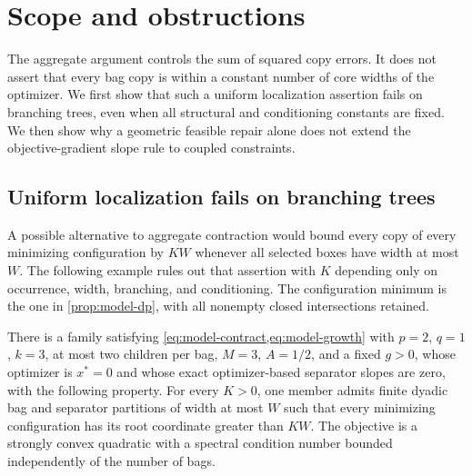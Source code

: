 \section{Scope and obstructions}\label{sec:limitations}

The aggregate argument controls the sum of squared copy errors. It does not
assert that every bag copy is within a constant number of core widths of
the optimizer. We first show that such a uniform localization assertion
fails on branching trees, even when all structural and conditioning
constants are fixed. We then show why a geometric feasible repair alone
does not extend the objective-gradient slope rule to coupled constraints.

\subsection{Uniform localization fails on branching trees}
\label{sec:limitations-localization}

A possible alternative to aggregate contraction would bound every copy of
every minimizing configuration by $KW$ whenever all selected boxes have
width at most $W$. The following example rules out that assertion with
$K$ depending only on occurrence, width, branching, and conditioning.
The configuration minimum is the one in \cref{prop:model-dp}, with all
nonempty closed intersections retained.

\begin{theorem}
\label{thm:limitations-localization}
There is a family satisfying \cref{eq:model-contract,eq:model-growth}
with $p=2$, $q=1$, $k=3$, at most two children per bag, $M=3$, $A=1/2$,
and a fixed $g>0$, whose optimizer is $x^*=0$ and whose exact
optimizer-based separator slopes are zero, with the following property.
For every $K>0$, one member admits finite dyadic bag and separator
partitions of width at most $W$ such that every minimizing configuration
has its root coordinate greater than $KW$. The objective is a strongly
convex quadratic with a spectral condition number bounded independently
of the number of bags.
\end{theorem}

